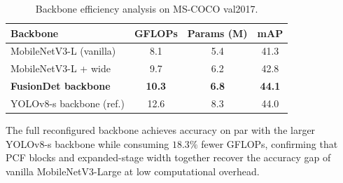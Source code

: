 \begin{table}[!t]
\centering
\caption{Backbone efficiency analysis on MS-COCO val2017.}
\label{tab:backbone_ablation}
\renewcommand{\arraystretch}{1.15}
\setlength{\tabcolsep}{4pt}
\begin{tabular}{l c c c}
\hline\hline
\textbf{Backbone}          & \textbf{GFLOPs} &
\textbf{Params (M)} & \textbf{mAP} \\
\hline
MobileNetV3-L (vanilla)    & 8.1  & 5.4  & 41.3 \\
MobileNetV3-L + wide       & 9.7  & 6.2  & 42.8 \\
\textbf{FusionDet backbone}& \textbf{10.3} & \textbf{6.8} &
\textbf{44.1} \\
YOLOv8-s backbone (ref.)   & 12.6 & 8.3  & 44.0 \\
\hline\hline
\end{tabular}
\end{table}

The full reconfigured backbone achieves accuracy on par with
the larger YOLOv8-s backbone while consuming $18.3\%$ fewer
GFLOPs, confirming that PCF blocks and expanded-stage width
together recover the accuracy gap of vanilla MobileNetV3-Large
at low computational overhead.
